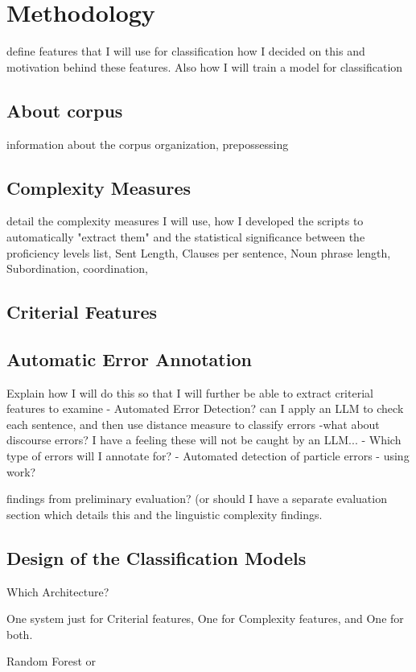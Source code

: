 \chapter{Methodology}
define  features that I will use for classification how I decided on this and motivation behind these features.
Also how I will train a model for classification 


\section{About corpus}
information about the corpus organization, prepossessing 

\section{Complexity Measures}
detail the complexity measures I will use, how I developed the scripts to automatically "extract them" and the statistical significance between the proficiency levels
list, Sent Length, Clauses per sentence, Noun phrase length,  Subordination, coordination, 

\section{Criterial Features}
\section{Automatic Error Annotation}
Explain how I will do this so that I will further be able to extract criterial features to examine
 - Automated Error Detection?
    can I apply an LLM to check each sentence, and then use distance measure to classify errors 
    -what about discourse errors? I have a feeling these will not be caught by an LLM...
 - Which type of errors will I annotate for? 
 - Automated detection of particle errors - using work?
 
 



findings from preliminary evaluation? (or should I have a separate evaluation section which details this and the linguistic complexity findings. 

\section{Design of the Classification Models}
Which Architecture?

One system just for Criterial features, One for Complexity features, and One for both. 

Random Forest or 
